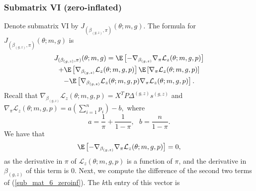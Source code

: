 \documentclass[12pt]{article}
\begin{document}
\begin{appendices}
\subsubsection*{Submatrix VI (zero-inflated)}
Denote submatrix VI by $J_{(\beta_{(g,z)},\pi)}(\theta; m, g).$ The formula for $J_{(\beta_{(g,z)},\pi)}(\theta; m, g)$ is
\begin{multline}\label{sub_mat_6_zeroinf}
J_{(\beta_{(g,z)},\pi)}(\theta; m, g) = \E \left[-\nabla_{\beta_{(g,z)}} \nabla_{\pi} \mathcal{L}_z(\theta; m, g, p) \right] \\ + \E\left[ \nabla_{\beta_{(g,z)}}\mathcal{L}_z(\theta; m, g ,p)\right] \E \left[ \nabla_{\pi}\mathcal{L}_z(\theta; m,g,p) \right] \\ - \E \left[ \nabla_{\beta_{(g,z)}}\mathcal{L}_z(\theta; m,g,p) \nabla_{\pi}\mathcal{L}_z(\theta; m,g,p) \right].
\end{multline} Recall that $\nabla_{\beta_{(g,z)}} \mathcal{L}_z(\theta; m, g, p) = X^T P \Delta^{(g,z)}s^{(g,z)}$ and $\nabla_\pi \mathcal{L}_z(\theta; m, g, p) = a \left(\sum_{i=1}^n p_i\right) - b,$ where $$a = \frac{1}{\pi} + \frac{1}{1 - \pi}, \textrm{    } b = \frac{n}{1 - \pi}.$$ 
We have that
\begin{equation}\label{sub_mat_6_zeroinf_1}
\E \left[-\nabla_{\beta_{(g,z)}} \nabla_{\pi} \mathcal{L}_z(\theta; m, g, p) \right] = 0,
\end{equation}
as the derivative in $\pi$ of $\mathcal{L}_z(\theta; m, g, p)$ is a function of $\pi$, and the derivative in $\beta_{(g,z)}$ of this term is $0$. Next, we compute the difference of the second two terms of (\ref{sub_mat_6_zeroinf}). The $k$th entry of this vector is
\begin{multline}\label{sub_mat_6_zeroinf_2}

\end{multline}
\end{appendices}
\end{document}
